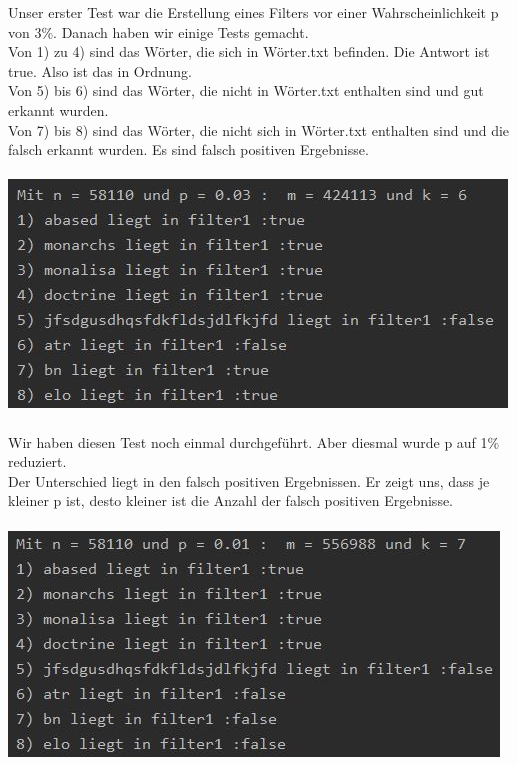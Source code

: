 \documentclass[12pt, letterpaper]{article}
\begin{document}
Unser erster Test war die Erstellung eines Filters vor einer Wahrscheinlichkeit p von 3\%. Danach haben wir einige Tests gemacht.\\
Von 1) zu 4) sind das Wörter, die sich in Wörter.txt befinden. Die Antwort ist true. Also ist das in Ordnung.\\
Von 5) bis 6) sind das Wörter, die nicht in Wörter.txt enthalten sind und gut erkannt wurden.\\
Von 7) bis 8) sind das Wörter, die nicht sich in Wörter.txt enthalten sind und die falsch erkannt wurden. Es sind falsch positiven Ergebnisse. \\ \\
\includegraphics{../Image/filter1}\\ \\
Wir haben diesen Test noch einmal durchgeführt. Aber diesmal wurde p auf 1\% reduziert.\\
Der Unterschied liegt in den falsch positiven Ergebnissen. Er zeigt uns, dass je kleiner p ist, desto kleiner ist die Anzahl der falsch positiven Ergebnisse.\\ \\
\includegraphics{../Image/filter2}
\end{document}
